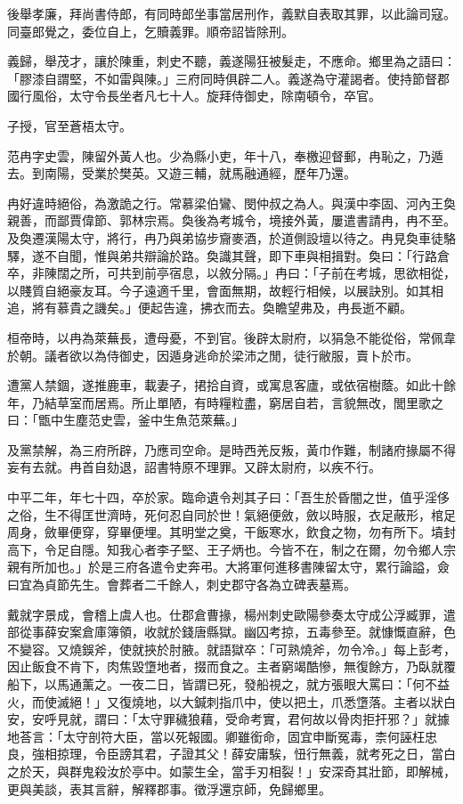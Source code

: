 \begin{pinyinscope}
後舉孝廉，拜尚書侍郎，有同時郎坐事當居刑作，義默自表取其罪，以此論司寇。同臺郎覺之，委位自上，乞贖義罪。順帝詔皆除刑。

義歸，舉茂才，讓於陳重，刺史不聽，義遂陽狂被髮走，不應命。鄉里為之語曰：「膠漆自謂堅，不如雷與陳。」三府同時俱辟二人。義遂為守灌謁者。使持節督郡國行風俗，太守令長坐者凡七十人。旋拜侍御史，除南頓令，卒官。

子授，官至蒼梧太守。

范冉字史雲，陳留外黃人也。少為縣小吏，年十八，奉檄迎督郵，冉恥之，乃遁去。到南陽，受業於樊英。又遊三輔，就馬融通經，歷年乃還。

冉好違時絕俗，為激詭之行。常慕梁伯鸞、閔仲叔之為人。與漢中李固、河內王奐親善，而鄙賈偉節、郭林宗焉。奐後為考城令，境接外黃，屢遣書請冉，冉不至。及奐遷漢陽太守，將行，冉乃與弟協步齎麥酒，於道側設壇以待之。冉見奐車徒駱驛，遂不自聞，惟與弟共辯論於路。奐識其聲，即下車與相揖對。奐曰：「行路倉卒，非陳闊之所，可共到前亭宿息，以敘分隔。」冉曰：「子前在考城，思欲相從，以賤質自絕豪友耳。今子遠適千里，會面無期，故輕行相候，以展訣別。如其相追，將有慕貴之譏矣。」便起告違，拂衣而去。奐瞻望弗及，冉長逝不顧。

桓帝時，以冉為萊蕪長，遭母憂，不到官。後辟太尉府，以狷急不能從俗，常佩韋於朝。議者欲以為侍御史，因遁身逃命於梁沛之閒，徒行敝服，賣卜於巿。

遭黨人禁錮，遂推鹿車，載妻子，捃拾自資，或寓息客廬，或依宿樹蔭。如此十餘年，乃結草室而居焉。所止單陋，有時糧粒盡，窮居自若，言貌無改，閭里歌之曰：「甑中生塵范史雲，釜中生魚范萊蕪。」

及黨禁解，為三府所辟，乃應司空命。是時西羌反叛，黃巾作難，制諸府掾屬不得妄有去就。冉首自劾退，詔書特原不理罪。又辟太尉府，以疾不行。

中平二年，年七十四，卒於家。臨命遺令刔其子曰：「吾生於昏闇之世，值乎淫侈之俗，生不得匡世濟時，死何忍自同於世！氣絕便斂，斂以時服，衣足蔽形，棺足周身，斂畢便穿，穿畢便埋。其明堂之奠，干飯寒水，飲食之物，勿有所下。墳封高下，令足自隱。知我心者李子堅、王子炳也。今皆不在，制之在爾，勿令鄉人宗親有所加也。」於是三府各遣令史奔弔。大將軍何進移書陳留太守，累行論謚，僉曰宜為貞節先生。會葬者二千餘人，刺史郡守各為立碑表墓焉。

戴就字景成，會稽上虞人也。仕郡倉曹掾，楊州刺史歐陽參奏太守成公浮臧罪，遣部從事薛安案倉庫簿領，收就於錢唐縣獄。幽囚考掠，五毒參至。就慷慨直辭，色不變容。又燒鋘斧，使就挾於肘腋。就語獄卒：「可熟燒斧，勿令冷。」每上彭考，因止飯食不肯下，肉焦毀墯地者，掇而食之。主者窮竭酷慘，無復餘方，乃臥就覆船下，以馬通薰之。一夜二日，皆謂已死，發船視之，就方張眼大罵曰：「何不益火，而使滅絕！」又復燒地，以大鍼刺指爪中，使以把土，爪悉墯落。主者以狀白安，安呼見就，謂曰：「太守罪穢狼藉，受命考實，君何故以骨肉拒扞邪？」就據地荅言：「太守剖符大臣，當以死報國。卿雖銜命，固宜申斷冤毒，柰何誣枉忠良，強相掠理，令臣謗其君，子證其父！薛安庸騃，忸行無義，就考死之日，當白之於天，與群鬼殺汝於亭中。如蒙生全，當手刃相裂！」安深奇其壯節，即解械，更與美談，表其言辭，解釋郡事。徵浮還京師，免歸鄉里。


\end{pinyinscope}
